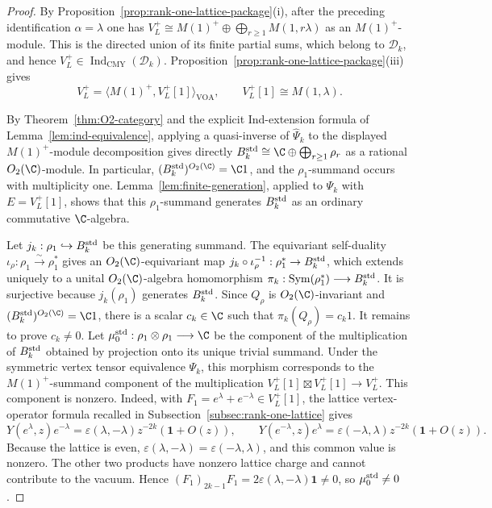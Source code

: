 \documentclass[12pt,leqno]{amsart}
\numberwithin{equation}{section} \newtheorem{thm}{Theorem}[section] \newtheorem{lem}[thm]{Lemma} \newtheorem{ex}[thm]{Example} \newtheorem{prop}[thm]{Proposition} \newtheorem{cor}[thm]{Corollary} \newtheorem{defi}[thm]{Definition} \newtheorem{rmk}[thm]{Remark} \newtheorem{notation}[thm]{Notation}
\newcommand{\one}{\mathbf{1}}
\newcommand{\Sym}{\operatorname{Sym}}
\newcommand{\Dk}{\mathcal D_k}
\newcommand{\IndCMY}{\operatorname{Ind}_{\mathrm{CMY}}}
\newcommand{\Otwo}{O_2(\C)}
\begin{document}
\begin{proof}
By Proposition~\ref{prop:rank-one-lattice-package}(i), after the preceding identification $\alpha=\lambda$ one has \(V_L^+\cong M(1)^+\oplus\bigoplus_{r\ge1}M(1,r\lambda)\) as an $M(1)^+$-module. This is the directed union of its finite partial sums, which belong to $\Dk$, and hence $V_L^+\in\IndCMY(\Dk)$. Proposition~\ref{prop:rank-one-lattice-package}(iii) gives
\[
V_L^+=\langle M(1)^+,V_L^+[1]\rangle_{\mathrm{VOA}},\qquad V_L^+[1]\cong M(1,\lambda).
\]

By Theorem~\ref{thm:O2-category} and the explicit Ind-extension formula of Lemma~\ref{lem:ind-equivalence}, applying a quasi-inverse of $\widehat\Psi_k$ to the displayed $M(1)^+$-module decomposition gives directly \(B_k^{\rm std}\cong\C\oplus\bigoplus_{r\ge1}\rho_r\) as a rational $\Otwo$-module. In particular, \((B_k^{\rm std})^{\Otwo}=\C1\), and the $\rho_1$-summand occurs with multiplicity one. Lemma~\ref{lem:finite-generation}, applied to $\Psi_k$ with $E=V_L^+[1]$, shows that this $\rho_1$-summand generates $B_k^{\rm std}$ as an ordinary commutative $\C$-algebra.

Let \(j_k:\rho_1\hookrightarrow B_k^{\rm std}\) be this generating summand. The equivariant self-duality $\iota_\rho:\rho_1\overset\sim\longrightarrow\rho_1^*$ gives an $\Otwo$-equivariant map $j_k\circ\iota_\rho^{-1}:\rho_1^*\to B_k^{\rm std}$, which extends uniquely to a unital $\Otwo$-algebra homomorphism \(\pi_k:\Sym(\rho_1^*)\longrightarrow B_k^{\rm std}\). It is surjective because $j_k(\rho_1)$ generates $B_k^{\rm std}$. Since $Q_\rho$ is $\Otwo$-invariant and $(B_k^{\rm std})^{\Otwo}=\C1$, there is a scalar $c_k\in\C$ such that \(\pi_k(Q_\rho)=c_k1\). It remains to prove $c_k\ne0$. Let \(\mu_0^{\rm std}:\rho_1\otimes\rho_1\longrightarrow\C\) be the component of the multiplication of $B_k^{\rm std}$ obtained by projection onto its unique trivial summand. Under the symmetric vertex tensor equivalence $\Psi_k$, this morphism corresponds to the $M(1)^+$-summand component of the multiplication \(V_L^+[1]\boxtimes V_L^+[1]\longrightarrow V_L^+\). This component is nonzero. Indeed, with $F_1=e^\lambda+e^{-\lambda}\in V_L^+[1]$, the lattice vertex-operator formula recalled in Subsection~\ref{subsec:rank-one-lattice} gives
\[
Y(e^\lambda,z)e^{-\lambda}
=\varepsilon(\lambda,-\lambda)z^{-2k}(\one+O(z)),
\qquad
Y(e^{-\lambda},z)e^\lambda
=\varepsilon(-\lambda,\lambda)z^{-2k}(\one+O(z)).
\]
Because the lattice is even, $\varepsilon(\lambda,-\lambda)=\varepsilon(-\lambda,\lambda)$, and this common value is nonzero. The other two products have nonzero lattice charge and cannot contribute to the vacuum. Hence \((F_1)_{2k-1}F_1=2\varepsilon(\lambda,-\lambda)\one\ne0\), so $\mu_0^{\rm std}\ne0$.


\end{proof}
\end{document}
